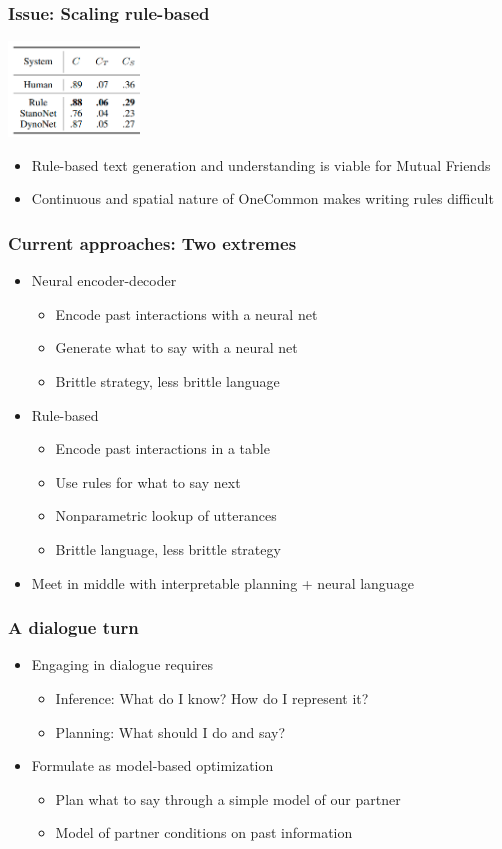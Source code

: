 \documentclass{beamer}
\begin{document}
\begin{frame}
\frametitle{Issue: Scaling rule-based}
\centering
\includegraphics[height=1in]{img/mf-res.png}
\begin{itemize}
\item Rule-based text generation and understanding is viable for Mutual Friends
\item Continuous and spatial nature of OneCommon makes writing rules difficult
\end{itemize}
\end{frame}

\begin{frame}
\frametitle{Current approaches: Two extremes}
\begin{itemize}
\item Neural encoder-decoder
    \begin{itemize}
    \item Encode past interactions with a neural net
    \item Generate what to say with a neural net
    \item Brittle strategy, less brittle language
    \end{itemize}
\item Rule-based
    \begin{itemize}
    \item Encode past interactions in a table
    \item Use rules for what to say next
    \item Nonparametric lookup of utterances
    \item Brittle language, less brittle strategy
    \end{itemize}
\item Meet in middle with interpretable planning + neural language
\end{itemize}
\end{frame}


\begin{frame}
\frametitle{A dialogue turn}
\begin{itemize}
\item Engaging in dialogue requires
    \begin{itemize}
    \item Inference: What do I know? How do I represent it?
    \item Planning: What should I do and say?
    \end{itemize}
\item Formulate as model-based optimization
    \begin{itemize}
    \item Plan what to say through a simple model of our partner
    \item Model of partner conditions on past information
    \end{itemize}
\end{itemize}
\end{frame}
\end{document}
